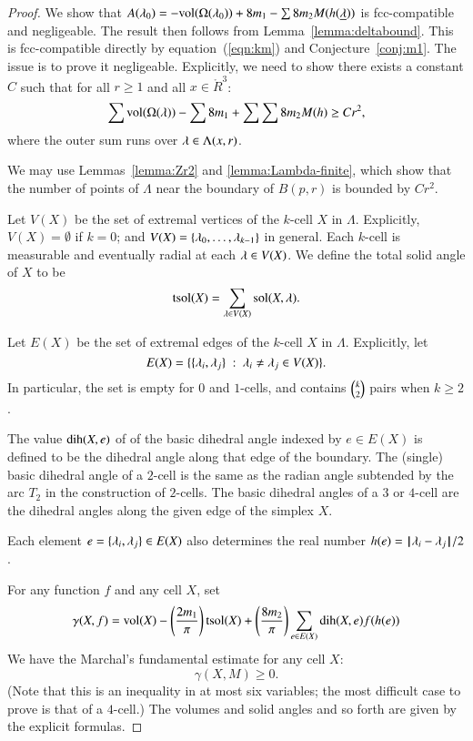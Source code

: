 \begin{proof} 
We show that $A(\lambda_0)  = -{\operatorname{vol}}(\Omega(\lambda_0)) + 8 m_1 - \sum 8 m_2 M(h({\underline{\lambda}}))$ is fcc-compatible and negligeable.  The
result then follows from Lemma~\ref{lemma:deltabound}.  
This is fcc-compatible directly
by equation~(\ref{eqn:km})
and Conjecture~\ref{conj:m1}.  The issue is to prove it negligeable.  Explicitly, we need
to show there exists a constant  $C$ such that for all $r\ge 1$ and all $x\in\ring{R}^3$:
\begin{equation}\label{eqn:neg}
  \sum {\operatorname{vol}}(\Omega(\lambda)) -\sum 8m_1 + \sum \sum 8 m_2 M(h) \ge C r^2,
\end{equation}
where the outer sum runs over $\lambda\in \Lambda(x,r)$.

We may use Lemmas~\ref{lemma:Zr2} and \ref{lemma:Lambda-finite}, which show that the number of points of $\Lambda$ near the boundary of $B(p,r)$ is bounded by $C r^2$.

Let $V(X)$ be the set of extremal vertices of the $k$-cell $X$ in $\Lambda$.  Explicitly, $V(X)=\emptyset$ if $k=0$; and $V(X) = \{\lambda_0,\ldots,\lambda_{k-1}\}$ in general.  Each $k$-cell is measurable and eventually
radial at each $\lambda\in V(X)$.  We define the total solid angle of $X$ to be
$$
{\operatorname{tsol}}(X) = \sum_{\lambda\in V(X)} \operatorname{sol}(X,\lambda).
$$

Let $E(X)$ be the set of extremal edges of the $k$-cell $X$ in $\Lambda$.  Explicitly, let 
$$E(X)=\{\{\lambda_i,\lambda_j\}\ :\  \lambda_i\ne\lambda_j\in V(X)\}.$$
In particular, the set is empty for $0$ and $1$-cells, and contains
$\tbinom{k}{2}$ pairs when $k\ge 2$.


The value
$\operatorname{dih}(X,e)$ of
of the basic dihedral angle indexed by $e\in E(X)$ is defined to be the dihedral angle along that edge
of the boundary.  
The (single) basic  dihedral angle of a $2$-cell is
the same as the radian angle subtended by the arc $T_2$ in the construction of $2$-cells.
The basic dihedral angles of a $3$ or $4$-cell are the dihedral angles along the given edge of the simplex $X$. 

Each element $e=\{\lambda_i,\lambda_j\}\in E(X)$ also determines
the real number $h(e) = {\hskip0.1em|\hskip-0.15em|\hskip0.1em}\lambda_i - \lambda_j{\hskip0.1em|\hskip-0.15em|\hskip0.1em}/2$.

For any function $f$ and any cell $X$, set
\begin{equation}\label{eqn:gamma-def}
\gamma(X,f) =  {\operatorname{vol}}(X)
-\left(\frac{2m_1}{\pi}\right) {\operatorname{tsol}}(X) + \left(\frac{8m_2}{\pi}\right)
\sum_{e\in E(X)} \operatorname{dih}(X,e)  f(h(e))
\end{equation}
We have the Marchal's fundamental estimate\cite[cc:mar]{hales:2009:nonlinear} for any cell $X$:  %
\begin{equation}\label{eqn:mfe}
\gamma(X,M)\ge 0.
\end{equation}
(Note that this is an inequality in at most six variables; the most difficult case to prove is that of a $4$-cell.)  The volumes and solid angles and so forth are given by the explicit formulas.


\end{proof}
